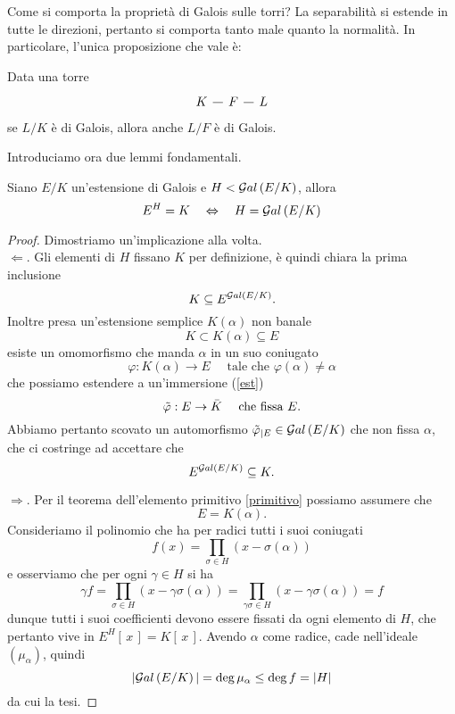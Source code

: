 \begin{multicols}{2}
	\begin{remark}
		Come si comporta la proprietà di Galois sulle torri? La separabilità si estende in tutte le direzioni, pertanto si comporta tanto male quanto la normalità. In particolare, l'unica proposizione che vale è:	 
	\end{remark}
\begin{prop}
	Data una torre 
	\[\begin{tikzcd}[column sep=0.30cm]
	K \arrow [r,-] &
	F \arrow [r,-] &
	L
	\end{tikzcd} \] se $ L/K $ è di Galois, allora anche $ L/F $ è di Galois.
\end{prop}
	\columnbreak
	Introduciamo ora due lemmi fondamentali.
	\begin{prop}\label{cosetta1}
		Siano $ E/K $ un'estensione di Galois e $ H < \mathcal{G}al\left( E/K \right) $, allora
		\[  E^H = K \quad\Leftrightarrow\quad H = \mathcal{G}al\left( E/K \right)  \]
	\end{prop}
	\begin{proof} Dimostriamo un'implicazione alla volta. \\
		$ \Leftarrow $. Gli elementi di $ H $ fissano $ K $ per definizione, è quindi chiara la prima inclusione
		\[ K \subseteq E^{\mathcal{G}al\left( E/K \right)}. \]
		Inoltre presa un'estensione semplice $ K(\alpha) $ non banale
		\[ K \subset K(\alpha) \subseteq E \]
		esiste un omomorfismo che manda $ \alpha $ in un suo coniugato
		\[ \varphi: K(\alpha) \to E \quad\text{ tale che } \varphi(\alpha)\neq \alpha \]
		che possiamo estendere a un'immersione (\ref{est})
		\[ \tilde{\varphi}: E \to \bar{K} \quad\text{ che fissa $ E $.} \]
		Abbiamo pertanto scovato un automorfismo $ \tilde{\varphi}_{|E} \in \mathcal{G}al\left( E/K \right) $ che non fissa $ \alpha $, che ci costringe ad accettare che
		\[ E^{\mathcal{G}al\left( E/K \right)} \subseteq K. \]
		
		$ \Rightarrow $. Per il teorema dell'elemento primitivo \ref{primitivo} possiamo assumere che
		\[ E = K(\alpha). \]
		Consideriamo il polinomio che ha per radici tutti i suoi coniugati
		\[ f(x) = \prod_{\sigma \in H}{(x - \sigma(\alpha))} \]
		e osserviamo che per ogni $ \gamma \in H $ si ha
		\[ \gamma f = \prod_{\sigma \in H}{(x - \gamma\sigma(\alpha))} = \prod_{\gamma\sigma \in H}{(x - \gamma\sigma(\alpha))} = f \]
		dunque tutti i suoi coefficienti devono essere fissati da ogni elemento di $ H $, che pertanto vive in $ E^H[\, x\,] = K[\, x\,] $.
		Avendo $ \alpha $ come radice, cade nell'ideale $ (\mu_\alpha) $, quindi
		\[ |\mathcal{G}al\left( E/K \right)| = \deg \mu_\alpha \leq \deg f = |H| \]
		da cui la tesi.
	\end{proof}
	

\end{multicols}

